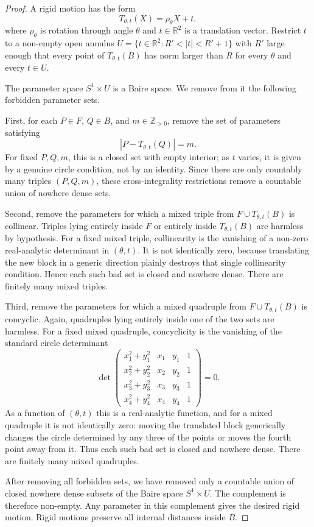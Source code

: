 \documentclass[11pt,a4paper]{amsart}
\theoremstyle{definition}
\newcommand{\R}{\mathbb{R}}
\newcommand{\Z}{\mathbb{Z}}
\begin{document}
\begin{proof}
A rigid motion has the form
\[
        T_{\theta,t}(X)=\rho_\theta X+t,
\]
where $\rho_\theta$ is rotation through angle $\theta$ and $t\in\R^2$ is a translation vector.  Restrict $t$ to a non-empty open annulus $U=\{t\in\R^2:R'<|t|<R'+1\}$ with $R'$ large enough that every point of $T_{\theta,t}(B)$ has norm larger than $R$ for every $\theta$ and every $t\in U$.

The parameter space $S^1\times U$ is a Baire space.  We remove from it the following forbidden parameter sets.

First, for each $P\in F$, $Q\in B$, and $m\in\Z_{>0}$, remove the set of parameters satisfying
\[
        |P-T_{\theta,t}(Q)|=m.
\]
For fixed $P,Q,m$, this is a closed set with empty interior; as $t$ varies, it is given by a genuine circle condition, not by an identity.  Since there are only countably many triples $(P,Q,m)$, these cross-integrality restrictions remove a countable union of nowhere dense sets.

Second, remove the parameters for which a mixed triple from $F\cup T_{\theta,t}(B)$ is collinear.  Triples lying entirely inside $F$ or entirely inside $T_{\theta,t}(B)$ are harmless by hypothesis.  For a fixed mixed triple, collinearity is the vanishing of a non-zero real-analytic determinant in $(\theta,t)$.  It is not identically zero, because translating the new block in a generic direction plainly destroys that single collinearity condition.  Hence each such bad set is closed and nowhere dense.  There are finitely many mixed triples.

Third, remove the parameters for which a mixed quadruple from $F\cup T_{\theta,t}(B)$ is concyclic.  Again, quadruples lying entirely inside one of the two sets are harmless.  For a fixed mixed quadruple, concyclicity is the vanishing of the standard circle determinant
\[
\det
\begin{pmatrix}
 x_1^2+y_1^2 & x_1 & y_1 & 1\\
 x_2^2+y_2^2 & x_2 & y_2 & 1\\
 x_3^2+y_3^2 & x_3 & y_3 & 1\\
 x_4^2+y_4^2 & x_4 & y_4 & 1
\end{pmatrix}=0.
\]
As a function of $(\theta,t)$ this is a real-analytic function, and for a mixed quadruple it is not identically zero: moving the translated block generically changes the circle determined by any three of the points or moves the fourth point away from it.  Thus each such bad set is closed and nowhere dense.  There are finitely many mixed quadruples.

After removing all forbidden sets, we have removed only a countable union of closed nowhere dense subsets of the Baire space $S^1\times U$.  The complement is therefore non-empty.  Any parameter in this complement gives the desired rigid motion.  Rigid motions preserve all internal distances inside $B$.
\end{proof}
\end{document}
